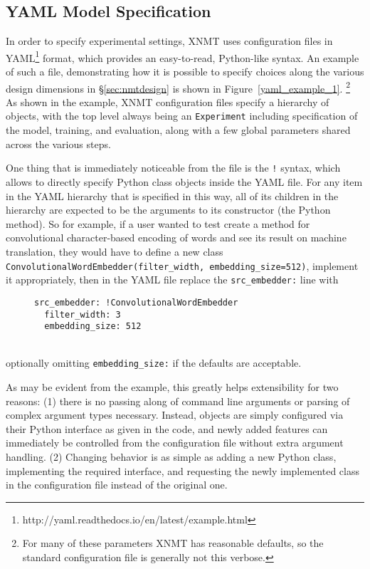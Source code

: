 \documentclass[]{article}
\begin{document}
\subsection{YAML Model Specification}

In order to specify experimental settings, XNMT uses configuration files in YAML\footnote{http://yaml.readthedocs.io/en/latest/example.html} format, which provides an easy-to-read, Python-like syntax.
An example of such a file, demonstrating how it is possible to specify choices along the various design dimensions in \S\ref{sec:nmtdesign} is shown in Figure~\ref{yaml_example_1}.%
\footnote{For many of these parameters XNMT has reasonable defaults, so the standard configuration file is generally not this verbose.}
As shown in the example, XNMT configuration files specify a hierarchy of objects, with the top level always being an \texttt{Experiment} including specification of the model, training, and evaluation, along with a few global parameters shared across the various steps.

One thing that is immediately noticeable from the file is the \texttt{!} syntax, which allows to directly specify Python class objects inside the YAML file.
For any item in the YAML hierarchy that is specified in this way, all of its children in the hierarchy are expected to be the arguments to its constructor (the Python  method).
So for example, if a user wanted to test create a method for convolutional character-based encoding of words \citep{zhang2015character} and see its result on machine translation, they would have to define a new class \texttt{ConvolutionalWordEmbedder(filter\_width, embedding\_size=512)}, implement it appropriately, then in the YAML file replace the \texttt{src\_embedder:} line with
\begin{figure}[h!]
  \begin{verbatim}
src_embedder: !ConvolutionalWordEmbedder
  filter_width: 3
  embedding_size: 512
\end{verbatim}
\vspace{-6mm}
\end{figure} \\
optionally omitting \texttt{embedding\_size:} if the defaults are acceptable.

As may be evident from the example, this greatly helps extensibility for two reasons: (1) there is no passing along of command line arguments or parsing of complex argument types necessary. Instead, objects are simply configured via their Python interface as given in the code, and newly added features can immediately be controlled from the configuration file without extra argument handling. (2) Changing behavior is as simple as adding a new Python class, implementing the required interface, and requesting the newly implemented class in the configuration file instead of the original one.
\end{document}
